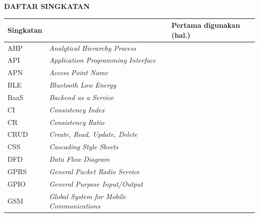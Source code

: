\cleardoublepage
\begin{center}
{\fontsize{14}{16.8}\selectfont\textbf{DAFTAR SINGKATAN}}\\[1em]
\end{center}
\label{chap:singkatan}
\vspace{2em}

\begin{longtable}{@{} l >{\raggedright\arraybackslash}p{8cm} c @{}}
\multicolumn{1}{l}{\textbf{Singkatan}} &
\multicolumn{1}{l}{\textbf{Deskripsi}} &
\multicolumn{1}{l}{\parbox[c]{3cm}{\raggedright\textbf{Pertama digunakan (hal.)}}} \\[0.5ex]
\hline
\endhead

AHP    & \textit{Analytical Hierarchy Process}                    & \pageref{sec:analisis-solusi} \\
API    & \textit{Application Programming Interface}               & \pageref{sec:perancangan-dashboard} \\
APN    & \textit{Access Point Name}                               & \pageref{tab:hasil-gprs} \\
BLE    & \textit{Bluetooth Low Energy}                            & \pageref{tab:perbandingan-mcu} \\
BaaS   & \textit{Backend as a Service}                            & \pageref{sec:perancangan-database} \\
CI     & \textit{Consistency Index}                               & \pageref{tab:bobot-kriteria} \\
CR     & \textit{Consistency Ratio}                               & \pageref{tab:bobot-kriteria} \\
CRUD   & \textit{Create, Read, Update, Delete}                    & \pageref{sec:impl-dashboard} \\
CSS    & \textit{Cascading Style Sheets}                          & \pageref{tab:teknologi-dashboard} \\
DFD    & \textit{Data Flow Diagram}                               & \pageref{sec:gambaran-umum} \\
GPRS   & \textit{General Packet Radio Service}                    & \pageref{tab:konfigurasi-lingkungan} \\
GPIO   & \textit{General Purpose Input/Output}                    & \pageref{sec:perancangan-firmware} \\
GSM    & \textit{Global System for Mobile Communications}         & \pageref{tab:konfigurasi-lingkungan} \\

\end{longtable}
